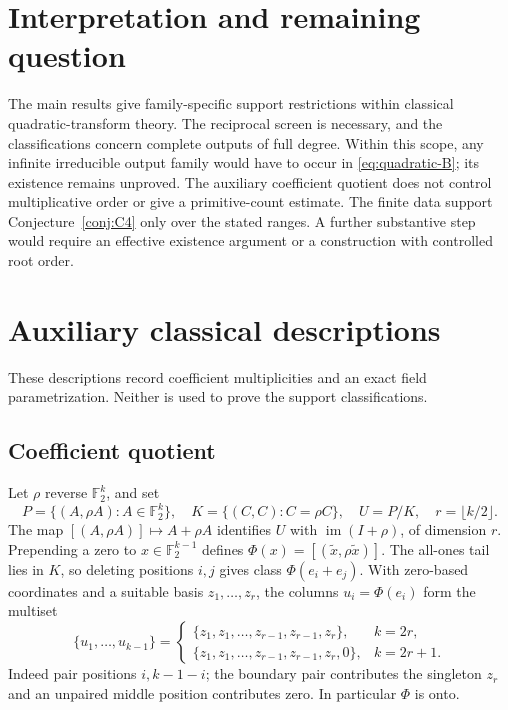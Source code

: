 \documentclass[11pt]{article}
\theoremstyle{definition}
\theoremstyle{remark}
\begin{document}
\section{Interpretation and remaining question}\label{sec:limits}
The main results give family-specific support restrictions within
classical quadratic-transform theory. The reciprocal screen is necessary,
and the classifications concern complete outputs of full degree.
Within this scope, any infinite irreducible output family would have to
occur in \eqref{eq:quadratic-B}; its existence remains unproved.
The auxiliary coefficient quotient does not control multiplicative order
or give a primitive-count estimate. The finite data support
Conjecture~\ref{conj:C4} only over the stated ranges. A further substantive
step would require an effective existence argument or a construction
with controlled root order.

\appendix
\section{Auxiliary classical descriptions}\label{sec:classical-descriptions}
These descriptions record coefficient multiplicities and an exact
field parametrization. Neither is used to prove the support classifications.

\subsection{Coefficient quotient}\label{sec:quotient}
Let $\rho$ reverse $\mathbb F_2^k$, and set
\[
 P=\{(A,\rho A):A\in\mathbb F_2^k\},\quad
 K=\{(C,C):C=\rho C\},\quad U=P/K,\quad r=\lfloor k/2\rfloor.
\]
The map $[(A,\rho A)]\mapsto A+\rho A$ identifies $U$ with
$\operatorname{im}(I+\rho)$, of dimension $r$.
Prepending a zero to $x\in\mathbb F_2^{k-1}$ defines
$\Phi(x)=[(\widetilde x,\rho\widetilde x)]$.
The all-ones tail lies in $K$, so deleting positions $i,j$ gives
class $\Phi(e_i+e_j)$. With zero-based coordinates and a suitable basis
$z_1,\ldots,z_r$, the columns $u_i=\Phi(e_i)$ form the multiset
\begin{equation}\label{eq:columns}
 \{u_1,\ldots,u_{k-1}\}=
 \begin{cases}
 \{z_1,z_1,\ldots,z_{r-1},z_{r-1},z_r\},&k=2r,\\
 \{z_1,z_1,\ldots,z_{r-1},z_{r-1},z_r,0\},&k=2r+1.
 \end{cases}
\end{equation}
Indeed pair positions $i,k-1-i$; the boundary pair contributes the
singleton $z_r$ and an unpaired middle position contributes zero.
In particular $\Phi$ is onto.
\end{document}
